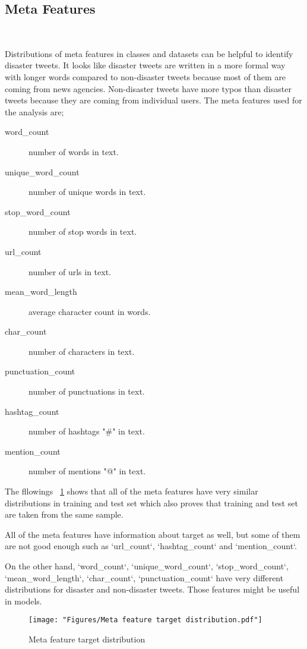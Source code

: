 \subsection{Meta Features}
\

Distributions of meta features in classes and datasets 
can be helpful to identify disaster tweets. It looks 
like disaster tweets are written in a more formal way 
with longer words compared to non-disaster tweets 
because most of them are coming from news agencies. 
Non-disaster tweets have more typos than disaster tweets 
because they are coming from individual users. The meta 
features used for the analysis are;

\begin{description}
	\item[word\_count] number of words in text.
	\item[unique\_word\_count] number of unique words in text.
	\item[stop\_word\_count] number of stop words in text.
	\item[url\_count] number of urls in text.
	\item[mean\_word\_length] average character count in words.
	\item[char\_count] number of characters in text.
	\item[punctuation\_count] number of punctuations in text.
	\item[hashtag\_count] number of hashtags "\#" in text.
	\item[mention\_count] number of mentions "@" in text.
\end{description}

The fllowings ~\cref{fig:Meta-feature-target-distribution} shows that 
all of the meta features have very similar distributions in 
training and test set which also proves that training and 
test set are taken from the same sample.

All of the meta features have information about target as 
well, but some of them are not good enough such as `url\_count`, 
`hashtag\_count` and `mention\_count`.

On the other hand, `word\_count`, `unique\_word\_count`, 
`stop\_word\_count`, `mean\_word\_length`, `char\_count`, 
`punctuation\_count` have very different distributions 
for disaster and non-disaster tweets. Those features 
might be useful in models.

\begin{figure}[tbph]
	\centering
	\texttt{[image: "Figures/Meta feature target distribution.pdf"]}
	\caption{Meta feature target distribution}
	\label{fig:Meta-feature-target-distribution}
\end{figure}



